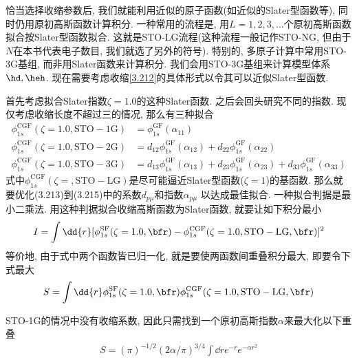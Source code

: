 恰当选择收缩参数后, 
我们就能利用近似的原子\hft 函数(如近似的Slater型函数等), 
同时仍用原初高斯函数计算积分. 
一种常用的流程是, 
用$L=1,2,3,\ldots$个原初高斯函数拟合按Slater型函数拟合. 
这就是STO-LG流程(这种流程一般记作STO-NG, 
但由于$N$在本书代表电子数目, 
我们就选了另外的符号). 
特别的, 
多原子计算中常用STO-3G基组, 
而非用Slater函数来计算积分. 
我们会用STO-3G基组来计算模型体系$\hd,\heh$. 
现在需要考虑收缩\autoref{3.212}的具体形式以令其可以近似Slater型函数.


首先考虑拟合Slater指数$\zeta=1.0$的这种Slater函数. 
之后会回头研究不同的指数. 
现仅考虑收缩长度不超过三的情况, 
那么有三种拟合
\begin{align}
	\phi_{1s}^\mathrm{CGF}(\zeta=1.0, \mathrm{STO-1G}) &= \phi_{1s}^\mathrm{GF}(\alpha_{11})\\
	\phi_{1s}^\mathrm{CGF}(\zeta=1.0, \mathrm{STO-2G}) &= d_{12}\phi_{1s}^\mathrm{GF}(\alpha_{12}) + d_{22}\phi_{1s}^\mathrm{GF}(\alpha_{22})\\
	\phi_{1s}^\mathrm{CGF}(\zeta=1.0, \mathrm{STO-3G}) &= d_{13}\phi_{1s}^\mathrm{GF}(\alpha_{13}) + d_{23}\phi_{1s}^\mathrm{GF}(\alpha_{23}) + d_{33}\phi_{1s}^\mathrm{GF}(\alpha_{33})
\end{align}
式中$\phi_{1s}^\mathrm{CGF}(\zeta=, \mathrm{STO-LG})$是尽可能逼近Slater型函数($\zeta=1$)的基函数. 
那么就要优化(3.213)到(3.215)中的系数$d_{p\mu}$和指数$\alpha_{p\mu}$
以达成最佳拟合. 
一种拟合判据是最小二乘法.
用这种判据拟合收缩高斯函数为Slater函数,
就要让如下积分最小
\begin{align}
	I = \int\dd{r}[\phi_{1s}^\mathrm{SF}(\zeta=1.0,\bfr) - \phi_{1s}^\mathrm{CGF}(\zeta=1.0, \mathrm{STO-LG},\bfr)]^2
\end{align}
等价地, 
由于式中两个函数皆已归一化, 
就是要使两函数间重叠积分最大, 
即要令下式最大
\begin{align}
	\label{3.217}
	S = \int\dd{r}\phi_{1s}^\mathrm{SF}(\zeta=1.0,\bfr)\phi_{1s}^\mathrm{CGF}(\zeta=1.0, \mathrm{STO-LG},\bfr)
\end{align}

STO-1G的情况中没有收缩系数, 因此只需找到一个原初高斯指数$\alpha$来最大化以下重叠
\begin{align}
	S = (\pi)^{-1/2}(2\alpha/\pi)^{3/4}\int\dd{r}e^{-r}e^{-\alpha r^2}
\end{align}

